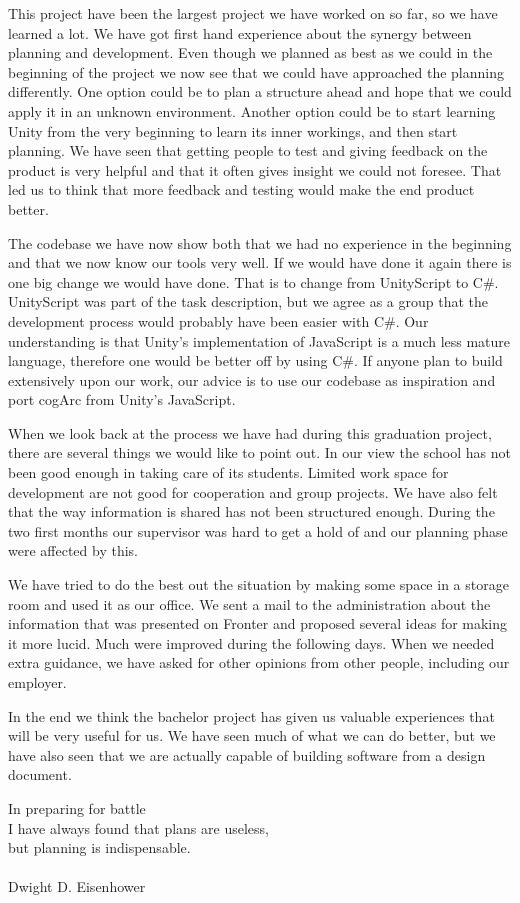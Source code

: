 This project have been the largest project we have worked on so far, so we have learned
a lot. We have got first hand experience about the synergy between planning and development.
Even though we planned as best as we could in the beginning of the project we now see that we could have approached the planning differently. One option could be to plan a structure ahead and hope that we could apply it in an unknown environment. Another option could be to start learning Unity from the very beginning to learn its inner workings, and then start planning.
We have seen that getting people to test and giving feedback on the product is very helpful and that it often gives insight we could not foresee. That led us to think that more feedback and testing would make the end product better.

The codebase we have now show both that we had no experience in the beginning and that we now know our tools very well. If we would have done it again there is one big change we would have done. That is to change from UnityScript to C\#. UnityScript was part of the task description, but we agree as a group that the development process would probably have been easier with C\#. Our understanding is that Unity’s implementation of JavaScript is a much less mature language, therefore one would be better off by using C\#. If anyone plan to build extensively upon our work, our advice is to use our codebase as inspiration and port cogArc from Unity’s JavaScript.

When we look back at the process we have had during this graduation project, there are several things we would like to point out.
In our view the school has not been good enough in taking care of its students. Limited work space for development are not good for cooperation and group projects. We have also felt that the way information is shared has not been structured enough. During the two first months our supervisor was hard to get a hold of and our planning phase were affected by this.

We have tried to do the best out the situation by making some space in a storage room and used it as our office. We sent a mail to the administration about the information that was presented on Fronter and proposed several ideas for making it more lucid. Much were improved during the following days. When we needed extra guidance, we have asked for other opinions from other people, including our employer.

In the end we think the bachelor project has given us valuable experiences that will be very useful for us. We have seen much of what we can do better, but we have also seen that we are actually capable of building software from a design document.


\vfill{}

\begin{center}
	In preparing for battle\\
	I have always found that plans are useless,\\
	but planning is indispensable. \\
	\paragraph{}
	\hfill{}\hfill{} Dwight D. Eisenhower \cite{Eisenhower}\hfill{}\hfill{}
\end{center}

\vfill{}